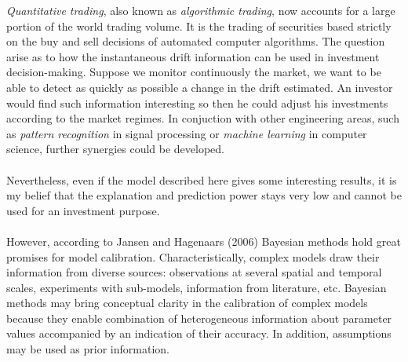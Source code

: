 \documentclass{article}
\theoremstyle{definition}
\theoremstyle{remark}
\begin{document}












\emph{Quantitative trading}, also known as \emph{algorithmic trading}, now accounts for a large portion of the world trading volume. It is the trading of securities based strictly on the buy and sell decisions of automated computer algorithms. The question arise as to how the instantaneous drift information can be used in investment decision-making. Suppose we monitor continuously the market, we want to be able to detect as quickly as possible a change in the drift estimated. An investor would find such information interesting so then he could adjust his investments according to the market regimes. In conjuction with other engineering areas, such as \emph{pattern recognition} in signal processing or \emph{machine learning} in computer science, further  synergies could be developed.\\
\\
Nevertheless, even if the model described here gives some interesting results, it is my belief that the explanation and prediction power stays very low and cannot be used for an investment purpose.\\
\\
However, according to Jansen and Hagenaars (2006) Bayesian methods hold great promises for model calibration. Characteristically, complex models draw their information from diverse sources: observations at several spatial and temporal scales, experiments with sub-models, information from literature, etc. Bayesian methods may bring conceptual clarity in the calibration of complex models because they enable combination of heterogeneous information about parameter values accompanied by an indication of their accuracy. In addition, assumptions may be used as prior information. 






\end{document}
